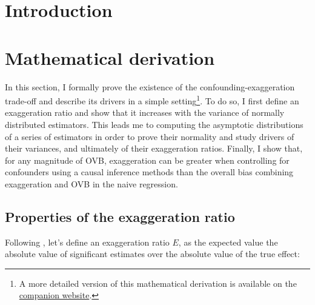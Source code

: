 \documentclass[usletter, 12pt]{article}
\begin{document}
	\section{Introduction}
	
		
	
	



	
	\section{Mathematical derivation} \label{maths}
						
		In this section, I formally prove the existence of the confounding-exaggeration trade-off  and describe its drivers in a simple setting\footnote{A more detailed version of this mathematical derivation is available on the \href{https://vincentbagilet.github.io/causal_exaggeration/Maths/math_causal_exaggeration.pdf}{companion website}.}. To do so, I first define an exaggeration ratio  and show that it increases with the variance of normally distributed estimators. This leads me to computing the asymptotic distributions of a series of estimators in order to prove their normality and study drivers of their variances, and ultimately of their exaggeration ratios. Finally, I show that, for any magnitude of OVB, exaggeration can be greater when controlling for confounders using a causal inference methods than the overall bias combining exaggeration and OVB in the naive regression.
		
		
		\subsection{Properties of the exaggeration ratio}\label{general_exagg}
		
			Following  \cite{gelman_beyond_2014}, let's define an exaggeration ratio $E$, as the expected value the absolute value of significant estimates over the absolute value of the true effect:
			
		 
\end{document}
